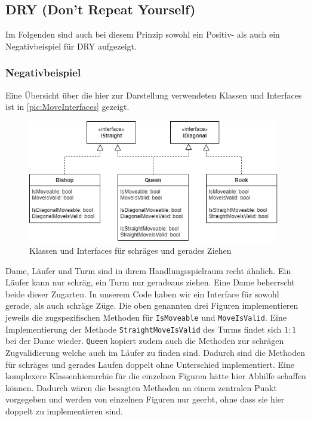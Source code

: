\documentclass[
10pt, %
a4paper, %
oneside, %
headinclude,footinclude, %
BCOR5mm, %
]{scrartcl}
\begin{document}
\begin{onehalfspace}
\subsection{DRY (Don't Repeat Yourself)}
Im Folgenden sind auch bei diesem Prinzip sowohl ein Positiv- als auch ein Negativbeispiel für DRY aufgezeigt. 

\subsubsection{Negativbeispiel}
Eine Übersicht über die hier zur Darstellung verwendeten Klassen und Interfaces ist in \autoref{pic:MoveInterfaces} gezeigt.

\begin{figure}[h]
	\begin{center}
		\includegraphics[width=11cm]{MoveInterfaces.png}
		\caption{\label{pic:MoveInterfaces}Klassen und Interfaces für schräges und gerades Ziehen}
	\end{center}
\end{figure}

Dame, Läufer und Turm sind in ihrem Handlungsspielraum recht ähnlich. Ein Läufer kann nur schräg, ein Turm nur geradeaus ziehen. Eine Dame beherrscht beide dieser Zugarten. In unserem Code haben wir ein Interface für sowohl gerade, als auch schräge Züge. Die oben genannten drei Figuren implementieren jeweils die zugspezifischen Methoden für \texttt{IsMoveable} und \texttt{MoveIsValid}. 
Eine Implementierung der Methode \texttt{StraightMoveIsValid} des Turms findet sich $1:1$ bei der Dame wieder. \texttt{Queen} kopiert zudem auch die Methoden zur schrägen Zugvalidierung welche auch im Läufer zu finden sind. Dadurch sind die Methoden für schräges und gerades Laufen doppelt ohne Unterschied implementiert. Eine komplexere Klassenhierarchie für die einzelnen Figuren hätte hier Abhilfe schaffen können. Dadurch wären die besagten Methoden an einem zentralen Punkt vorgegeben und werden von einzelnen Figuren nur geerbt, ohne dass sie hier doppelt zu implementieren sind.


\end{onehalfspace}
\end{document}

